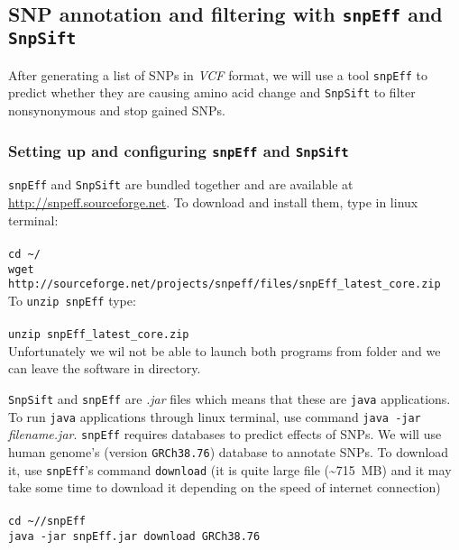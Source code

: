 \subsection{SNP annotation and filtering with \texttt{snpEff} and \texttt{SnpSift}}
After generating a list of SNPs in \textit{VCF} format,
we will use a tool \texttt{snpEff} to predict whether they are causing
amino acid change and \texttt{SnpSift} to filter nonsynonymous and stop gained SNPs.
\subsubsection{Setting up and configuring \texttt{snpEff} and \texttt{SnpSift}}
\texttt{snpEff} and \texttt{SnpSift} are bundled together and are available at \url{http://snpeff.sourceforge.net}.
To download and install them, type in linux terminal:\\~\\
\texttt{cd \textasciitilde/\progDir} \\
\texttt{wget http://sourceforge.net/projects/snpeff/files/snpEff\_latest\_core.zip} \\

To \texttt{unzip snpEff} type:\\~\\
\texttt{unzip snpEff\_latest\_core.zip}\\

Unfortunately we wil not be able to launch both programs from \texttt{\binDir} folder
and we can leave the software in \texttt{\progDir} directory.

\texttt{SnpSift} and \texttt{snpEff} are \textit{.jar} files which means that
these are \texttt{java} applications. To run \texttt{java} applications through linux terminal,
use command \texttt{java -jar} \textit{filename.jar}. 
\texttt{snpEff} requires databases to predict effects of SNPs.
We will use human genome's (version \texttt{GRCh38.76}) database to annotate SNPs.
To download it, use \texttt{snpEff}'s command \texttt{download} (it is quite large file (\textasciitilde 715~MB) and it may take some
time to download it depending on the speed of internet connection)\\~\\
\texttt{cd \textasciitilde/\progDir/snpEff}\\
\texttt{java -jar snpEff.jar download GRCh38.76}\\

